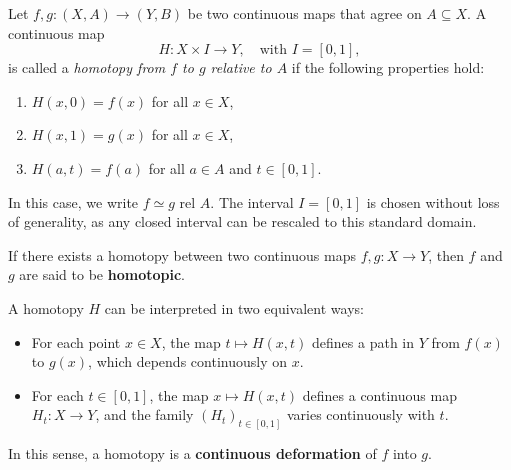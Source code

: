 \begin{definition}[Homotopy]
	Let \( f, g \colon (X,A) \rightarrow (Y,B) \) be two continuous maps that agree on \( A \subseteq X \).  
	A continuous map
	\[
	H \colon X \times I \rightarrow Y, \quad \text{with } I = [0,1],
	\]
	is called a \emph{homotopy from \( f \) to \( g \) relative to \( A \)} if the following properties hold:
	\begin{enumerate}
		\item \( H(x,0) = f(x) \) for all \( x \in X \),
		\item \( H(x,1) = g(x) \) for all \( x \in X \),
		\item \( H(a,t) = f(a) \) for all \( a \in A \) and \( t \in [0,1] \).
	\end{enumerate}
	In this case, we write \( f \simeq g \) rel \( A \).  
	The interval \( I = [0,1] \) is chosen without loss of generality, as any closed interval can be rescaled to this standard domain.
\end{definition}

If there exists a homotopy between two continuous maps \( f, g \colon X \rightarrow Y \), then \( f \) and \( g \) are said to be \textbf{homotopic}.

A homotopy \( H \) can be interpreted in two equivalent ways:
\begin{itemize}
	\item For each point \( x \in X \), the map \( t \mapsto H(x,t) \) defines a path in \( Y \) from \( f(x) \) to \( g(x) \), which depends continuously on \( x \).
	\item For each \( t \in [0,1] \), the map \( x \mapsto H(x,t) \) defines a continuous map \( H_t \colon X \rightarrow Y \), and the family \( (H_t)_{t \in [0,1]} \) varies continuously with \( t \).
\end{itemize}

In this sense, a homotopy is a \textbf{continuous deformation} of \( f \) into \( g \).



